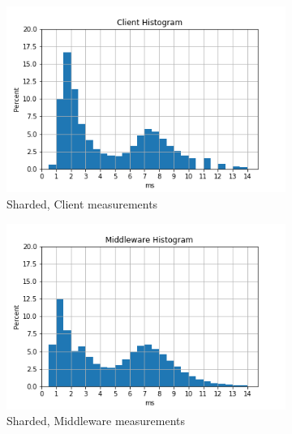 \documentclass[11pt,a4paper]{article}
\begin{document}
\begin{figure}[] 
  \begin{subfigure}[b]{0.5\linewidth}
    \centering
    \includegraphics[width=1\linewidth]{51/51_client_histogram.png} 
    \caption{Sharded, Client measurements} 
    \label{fig7:a} 
    \vspace{4ex}
  \end{subfigure}%
  \begin{subfigure}[b]{0.5\linewidth}
    \centering
    \includegraphics[width=1\linewidth]{51/51_mw_histogram.png} 
    \caption{Sharded, Middleware measurements} 
    \label{fig7:b} 
    \vspace{4ex}
  \end{subfigure}
  \begin{subfigure}[b]{0.5\linewidth}
    \centering

\end{subfigure}
\end{figure}
\end{document}
